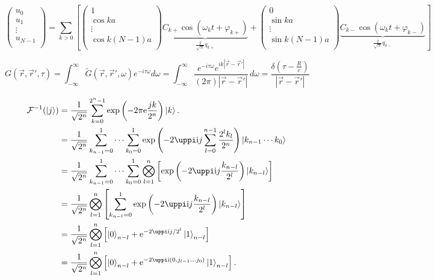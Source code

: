 \documentclass{article}
\begin{document}
\[\left( \begin{matrix}
{{u}_{0}}  \\
{{u}_{1}}  \\
\vdots   \\
{{u}_{N-1}}  \\
\end{matrix} \right)=\sum\limits_{k>0}{\left[ \left( \begin{matrix}
	1  \\
	\cos ka  \\
	\vdots   \\
	\cos k\left( N-1 \right)a  \\
	\end{matrix} \right)\underbrace{{{C}_{k+}}\cos \left( {{\omega }_{k}}t+{{\varphi }_{k+}} \right)}_{\frac{2}{\sqrt{N}}{{q}_{k+}}}+\left( \begin{matrix}
	0  \\
	\sin ka  \\
	\vdots   \\
	\sin k\left( N-1 \right)a  \\
	\end{matrix} \right)\underbrace{{{C}_{k-}}\cos \left( {{\omega }_{k}}t+{{\varphi }_{k-}} \right)}_{\frac{2}{\sqrt{N}}{{q}_{k-}}} \right]}\]

\[G(\vec{r},{\vec{r}}',\tau )=\int _{-\infty }^{\infty }\tilde{G}(\vec{r},{\vec{r}}',\omega )e^{-i \tau  \omega }d\omega=\int_{-\infty }^{\infty } \frac{e^{-i \tau  \omega } e^{i k |\vec{r}-{\vec{r}}'| }}{(2 \pi ) |\vec{r}-{\vec{r}}'| } \, d\omega=\frac{\delta  \left(\tau -\frac{R}{c}\right)}{|\vec{r}-{\vec{r}}'| }\]


\def\ii{\mathrm{i}}

\[
\begin{split}	
\mathcal{F}^{-1}(\ket{j})
&{}=\frac{1}{\sqrt{2^n}}\sum_{k=0}^{2^n-1}\exp\left(-2\pi \ee \frac{jk}{2^n}\right)\ket{k}.\\
&{}=\frac{1}{\sqrt{2^n}}\sum_{k_{n-1}=0}^1\cdots\sum_{k_{0}=0}^1\exp\left(-2\uppi \ii j\sum_{l=0}^{n-1}\frac{2^l k_l}{2^n}\right)\ket{k_{n-1}\cdots k_0}\\
&{}=\frac{1}{\sqrt{2^n}}\sum_{k_{n-1}=0}^1\cdots\sum_{k_{0}=0}^1\bigotimes_{l=1}^n\left[\exp\left(-2\uppi \ii j\frac{k_{n-l}}{2^l}\right)\ket{k_{n-l}}\right]\\
&{}=\frac{1}{\sqrt{2^n}}\bigotimes_{l=1}^n\left[\sum_{k_{n-l}=0}^1\exp\left(-2\uppi \ii j\frac{k_{n-l}}{2^l}\right)\ket{k_{n-l}}\right]\\
&{}=\frac{1}{\sqrt{2^n}}\bigotimes_{l=1}^n\left[\ket{0}_{n-l}+\ee^{-2\uppi \ii j /2^l}\ket{1}_{n-l}\right]\\
&{}=\frac{1}{\sqrt{2^n}}\bigotimes_{l=1}^n\left[\ket{0}_{n-l}+\ee^{-2\uppi \ii ({0.j_{l-1}\ldots j_0})}\ket{1}_{n-l}\right].
\end{split}
\]
\end{document}
